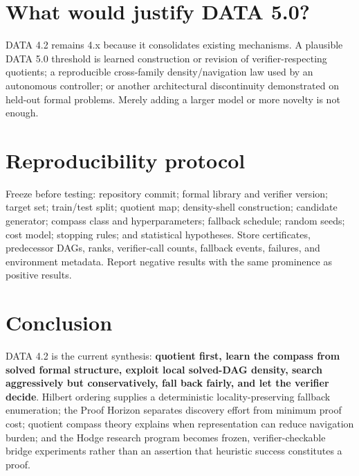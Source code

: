 \documentclass[11pt]{article}
\begin{document}
\section{What would justify DATA 5.0?}
DATA 4.2 remains 4.x because it consolidates existing mechanisms. A plausible DATA 5.0 threshold is learned construction or revision of verifier-respecting quotients; a reproducible cross-family density/navigation law used by an autonomous controller; or another architectural discontinuity demonstrated on held-out formal problems. Merely adding a larger model or more novelty is not enough.
\section{Reproducibility protocol}
Freeze before testing: repository commit; formal library and verifier version; target set; train/test split; quotient map; density-shell construction; candidate generator; compass class and hyperparameters; fallback schedule; random seeds; cost model; stopping rules; and statistical hypotheses. Store certificates, predecessor DAGs, ranks, verifier-call counts, fallback events, failures, and environment metadata. Report negative results with the same prominence as positive results.
\section{Conclusion}
DATA 4.2 is the current synthesis: \textbf{quotient first, learn the compass from solved formal structure, exploit local solved-DAG density, search aggressively but conservatively, fall back fairly, and let the verifier decide}. Hilbert ordering supplies a deterministic locality-preserving fallback enumeration; the Proof Horizon separates discovery effort from minimum proof cost; quotient compass theory explains when representation can reduce navigation burden; and the Hodge research program becomes frozen, verifier-checkable bridge experiments rather than an assertion that heuristic success constitutes a proof.
\end{document}
